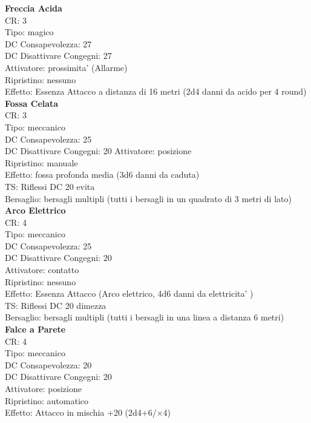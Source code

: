 \documentclass[a4paper,11pt,twoside,openany]{book}
\begin{document}
{\begin{multicols}{2}
\textbf{Freccia Acida}\\
CR: 3 \\
Tipo: magico \\
DC Consapevolezza: 27 \\
DC Disattivare Congegni: 27 \\
Attivatore: prossimita' (Allarme) \\
Ripristino: nessuno \\
Effetto: Essenza Attacco a distanza di 16 metri (2d4 danni da acido per 4 round)\\

\textbf{Fossa Celata}\\
CR: 3 \\
Tipo: meccanico \\
DC Consapevolezza: 25 \\
DC Disattivare Congegni: 20 
Attivatore: posizione \\
Ripristino: manuale \\
Effetto: fossa profonda media (3d6 danni da caduta) \\
TS: Riflessi DC 20 evita \\
Bersaglio: bersagli multipli (tutti i bersagli in un quadrato di 3 metri di lato)\\

\textbf{Arco Elettrico}\\
CR: 4 \\
Tipo: meccanico \\
DC Consapevolezza: 25 \\
DC Disattivare Congegni: 20 \\
Attivatore: contatto \\
Ripristino: nessuno \\
Effetto: Essenza Attacco (Arco elettrico, 4d6 danni da elettricita' )\\
TS: Riflessi DC 20 dimezza \\
Bersaglio: bersagli multipli (tutti i bersagli in una linea a distanza 6 metri)\\

\textbf{Falce a Parete}\\
CR: 4 \\
Tipo: meccanico \\
DC Consapevolezza: 20 \\
DC Disattivare Congegni: 20 \\
Attivatore: posizione \\
Ripristino: automatico \\
Effetto: Attacco in mischia +20 (2d4+6/×4)\\


\end{multicols}}
\end{document}
